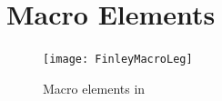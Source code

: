 
\clearpage

\clearpage

\section{Macro Elements}
\label{SEC FINLEY MACRO}

\begin{figure}[th]
\begin{center}
\texttt{[image: FinleyMacroLeg]}\\
\quad
{}
\end{center}
\caption{Macro elements in \finley}
\end{figure}

